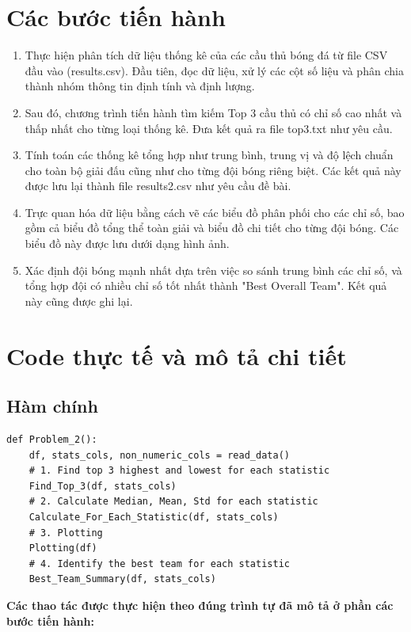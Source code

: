 \documentclass[12pt]{report}
\begin{document}
{\section{Các bước tiến hành}
\begin{enumerate}
	\item Thực hiện phân tích dữ liệu thống kê của các cầu thủ bóng đá từ file CSV đầu vào (results.csv). Đầu tiên, đọc dữ liệu, xử lý các cột số liệu và phân chia thành nhóm thông tin định tính và định lượng.
	\item Sau đó, chương trình tiến hành tìm kiếm Top 3 cầu thủ có chỉ số cao nhất và thấp nhất cho từng loại thống kê. Đưa kết quả ra file top3.txt như yêu cầu.
	\item Tính toán các thống kê tổng hợp như trung bình, trung vị và độ lệch chuẩn cho toàn bộ giải đấu cũng như cho từng đội bóng riêng biệt. Các kết quả này được lưu lại thành file results2.csv như yêu cầu đề bài.
	\item Trực quan hóa dữ liệu bằng cách vẽ các biểu đồ phân phối cho các chỉ số, bao gồm cả biểu đồ tổng thể toàn giải và biểu đồ chi tiết cho từng đội bóng. Các biểu đồ này được lưu dưới dạng hình ảnh.
	\item Xác định đội bóng mạnh nhất dựa trên việc so sánh trung bình các chỉ số, và tổng hợp đội có nhiều chỉ số tốt nhất thành "Best Overall Team". Kết quả này cũng được ghi lại.
\end{enumerate}
\section{Code thực tế và mô tả chi tiết}
\subsection{Hàm chính}
\begin{lstlisting}
def Problem_2():
    df, stats_cols, non_numeric_cols = read_data()
    # 1. Find top 3 highest and lowest for each statistic
    Find_Top_3(df, stats_cols)
    # 2. Calculate Median, Mean, Std for each statistic
    Calculate_For_Each_Statistic(df, stats_cols)
    # 3. Plotting
    Plotting(df)
    # 4. Identify the best team for each statistic
    Best_Team_Summary(df, stats_cols)
\end{lstlisting}
\textbf{Các thao tác được thực hiện theo đúng trình tự đã mô tả ở phần các bước tiến hành:}\\

}
\end{document}

